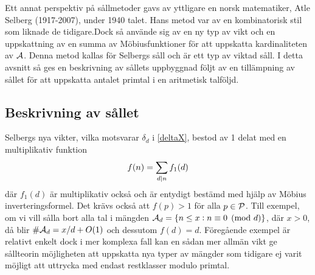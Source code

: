 Ett annat perspektiv på sållmetoder gavs av yttligare en norsk matematiker, Atle Selberg (1917-2007), under 1940 talet. 
Hans metod var av en kombinatorisk stil som liknade de tidigare.Dock så använde sig av en ny typ av vikt och en uppskattning av en summa av Möbiusfunktioner för att uppskatta kardinaliteten av \(\A\).
Denna metod kallas för Selbergs såll och är ett typ av viktad såll. I detta avsnitt så ges en beskrivning av sållets uppbyggnad följt av en tillämpning av sållet för att uppskatta antalet primtal i en aritmetisk talföljd.

\subsection{Beskrivning av sållet}
Selbergs nya vikter, vilka motsvarar \(\delta_d\) i \eqref{deltaX}, bestod av 1 delat med en multiplikativ funktion 
\begin{equation}
    f(n) = \sum_{d\divides n}f_1(d)\nonumber
\end{equation}
där \(f_1(d)\) är  multiplikativ också och är entydigt bestämd med hjälp av Möbius inverteringsformel. Det krävs också att \(f(p) > 1\) för alla \(p\in\P\).
Till exempel, om vi vill sålla bort alla tal i mängden \(\A_d = \{n\leq x:n \equiv 0 \pmod{d}\}\), där \(x>0\), då blir \(\#\A_d = x/d + O(1)\) och dessutom \(f(d) = d\).
Föregående exempel är relativt enkelt dock i mer komplexa fall kan en sådan mer allmän vikt ge sållteorin möjligheten att uppskatta nya typer av mängder som tidigare ej varit möjligt att uttrycka med endast restklasser modulo primtal. 

